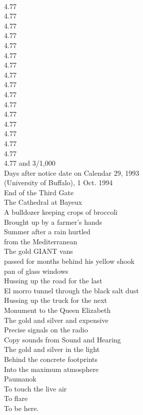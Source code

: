 \documentclass[smalldemyvopaper,11pt,twoside,onecolumn,openright,extrafontsizes]{memoir}
\begin{document}
\\4.77
\\4.77
\\4.77
\\4.77
\\4.77
\\4.77
\\4.77
\\4.77
\\4.77
\\4.77
\\4.77
\\4.77
\\4.77
\\4.77
\\4.77
\\4.77
\\4.77 and 3/1,000
\\Days after notice date on Calendar 29, 1993
\\(University of Buffalo), 1 Oct. 1994
\\End of the Third Gate
\\The Cathedral at Bayeux
\\A bulldozer keeping crops of broccoli
\\Brought up by a farmer's hands
\\Summer after a rain hurtled
\\from the Mediterranean
\\The gold GIANT vans
\\passed for months behind his yellow shook
\\pan of glass windows
\\Hussing up the road for the last
\\El morro tunnel through the black salt dust
\\Hussing up the truck for the next
\\Monument to the Queen Elizabeth
\\The gold and silver and expensive
\\Precise signals on the radio
\\Copy sounds from Sound and Hearing
\\The gold and silver in the light
\\Behind the concrete footprints
\\Into the maximum atmosphere
\\Paumanok
\\To touch the live air
\\To flare
\\To be here.
\end{document}
